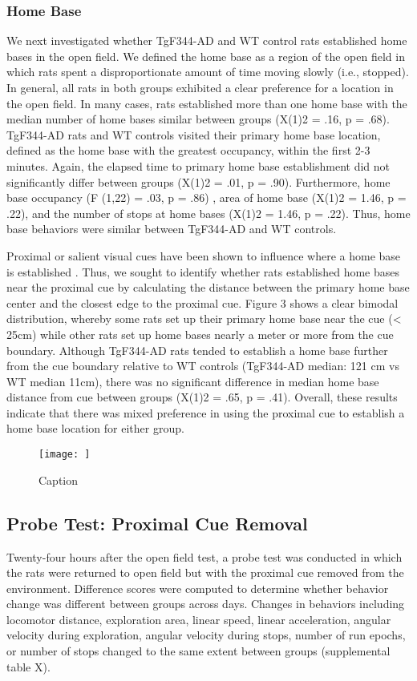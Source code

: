 \documentclass[fleqn,10pt]{wlscirep}
\begin{document}
\subsubsection*{Home Base} We next investigated whether TgF344-AD and WT control rats established home bases in the open field. We defined the home base as a region of the open field in which rats spent a disproportionate amount of time moving slowly (i.e., stopped). In general, all rats in both groups exhibited a clear preference for a location in the open field. In many cases, rats established more than one home base with the median number of home bases similar between groups (X(1)2 = .16, p = .68). TgF344-AD rats and WT controls visited their primary home base location, defined as the home base with the greatest occupancy, within the first 2-3 minutes. Again, the elapsed time to primary home base establishment did not significantly differ between groups (X(1)2 = .01, p = .90). Furthermore, home base occupancy (F (1,22) = .03, p = .86) , area of home base (X(1)2 = 1.46, p = .22), and the number of stops at home bases (X(1)2 = 1.46, p = .22). Thus, home base behaviors were similar between TgF344-AD and WT controls. 

Proximal or salient visual cues have been shown to influence where a home base is established \cite{nemati_point_2007,hines_home_2005}. Thus, we sought to identify whether rats established home bases near the proximal cue by calculating the distance between the primary home base center and the closest edge to the proximal cue. Figure 3 shows a clear bimodal distribution, whereby some rats set up their primary home base near the cue (< 25cm) while other rats set up home bases nearly a meter or more from the cue boundary. Although TgF344-AD rats tended to establish a home base further from the cue boundary relative to WT controls (TgF344-AD median: 121 cm vs WT median 11cm), there was no significant difference in median home base distance from cue between groups  (X(1)2 = .65, p = .41). Overall, these results indicate that there was mixed preference in using the proximal cue to establish a home base location for either group. 

\begin{figure}
    \centering
    \texttt{[image: ]}
    \caption{Caption}
    \label{proximal_cue_fig}
\end{figure}

\subsection*{Probe Test: Proximal Cue Removal}
Twenty-four hours after the open field test, a probe test was conducted in which the rats were returned to open field but with the proximal cue removed from the environment. Difference scores were computed to determine whether behavior change was different between groups across days. Changes in behaviors including locomotor distance, exploration area, linear speed, linear acceleration, angular velocity during exploration, angular velocity during stops, number of run epochs, or number of stops changed to the same extent between groups (supplemental table X). 
\end{document}
